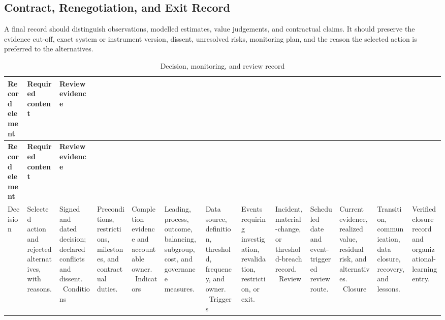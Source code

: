 \subsection{Contract, Renegotiation, and Exit Record}
\label{sec:comp-ch09-supp-3}
A final record should distinguish observations, modelled estimates, value
judgements, and contractual claims. It should preserve the evidence cut-off, exact
system or instrument version, dissent, unresolved risks, monitoring plan, and the
reason the selected action is preferred to the alternatives.

\begin{longtable}{@{}p{}p{}p{}@{}}
\caption{Decision, monitoring, and review record}
\label{tab:comp-ch09-decision-record}\\
\toprule
\textbf{Record element} & \textbf{Required content} & \textbf{Review evidence} \\
\midrule
\endfirsthead
\toprule
\textbf{Record element} & \textbf{Required content} & \textbf{Review evidence} \\
\midrule
\endhead
\bottomrule
\endlastfoot
Decision & Selected action and rejected alternatives, with reasons. & Signed and dated decision; declared conflicts and dissent. \
Conditions & Preconditions, restrictions, milestones, and contractual duties. & Completion evidence and accountable owner. \
Indicators & Leading, process, outcome, balancing, subgroup, cost, and governance measures. & Data source, definition, threshold, frequency, and owner. \
Triggers & Events requiring investigation, revalidation, restriction, or exit. & Incident, material-change, or threshold-breach record. \
Review & Scheduled date and event-triggered review route. & Current evidence, realized value, residual risk, and alternatives. \
Closure & Transition, communication, data closure, recovery, and lessons. & Verified closure record and organizational-learning entry. \
\end{longtable}
